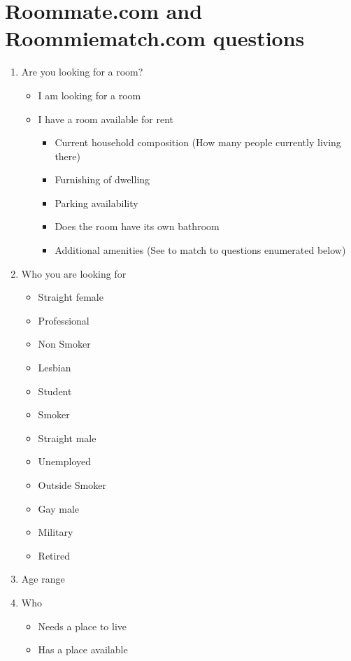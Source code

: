 \documentclass[journal]{./IEEE/IEEEtran}
\begin{document}
\section{Roommate.com and Roommiematch.com questions} %
\begin{enumerate}
    \item Are you looking for a room?
    \begin{itemize}
        \item I am looking for a room
        \item I have a room available for rent
        \begin{itemize}
            \item Current household composition (How many people currently living there)
            \item Furnishing of dwelling
            \item Parking availability
            \item Does the room have its own bathroom
            \item Additional amenities (See to match to questions enumerated below)
        \end{itemize}
    \end{itemize}
    \item Who you are looking for
    \begin{itemize}
        \item Straight female
        \item Professional
        \item Non Smoker
        \item Lesbian
        \item Student
        \item Smoker
        \item Straight male
        \item Unemployed
        \item Outside Smoker
        \item Gay male
        \item Military
        \item Retired
    \end{itemize}
    \item Age range
    \item Who
    \begin{itemize}
        \item Needs a place to live
        \item Has a place available

\end{itemize}
\end{enumerate}
\end{document}
